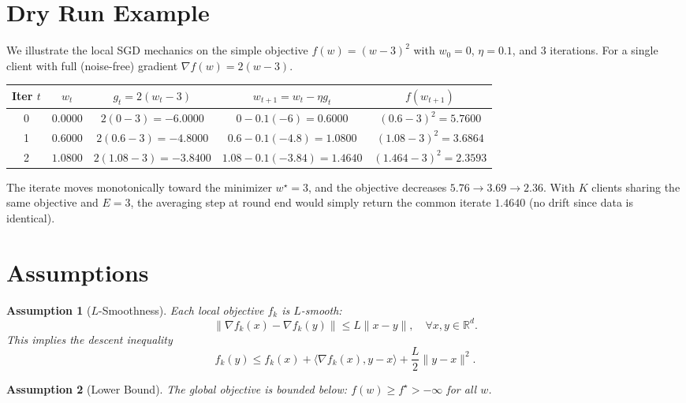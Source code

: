 \documentclass[11pt]{article}
\newtheorem{assumption}{Assumption}
\begin{document}
\section*{Dry Run Example}

We illustrate the local SGD mechanics on the simple objective
$f(w) = (w-3)^2$ with $w_0 = 0$, $\eta = 0.1$, and $3$ iterations.
For a single client with full (noise-free) gradient
$\nabla f(w) = 2(w-3)$.

\begin{center}
\begin{tabular}{c|c|c|c|c}
Iter $t$ & $w_t$ & $g_t = 2(w_t - 3)$ & $w_{t+1} = w_t - \eta g_t$ & $f(w_{t+1})$\\
\hline
0 & $0.0000$ & $2(0-3) = -6.0000$ & $0 - 0.1(-6) = 0.6000$ & $(0.6-3)^2 = 5.7600$\\
1 & $0.6000$ & $2(0.6-3) = -4.8000$ & $0.6 - 0.1(-4.8) = 1.0800$ & $(1.08-3)^2 = 3.6864$\\
2 & $1.0800$ & $2(1.08-3) = -3.8400$ & $1.08 - 0.1(-3.84) = 1.4640$ & $(1.464-3)^2 = 2.3593$\\
\end{tabular}
\end{center}

The iterate moves monotonically toward the minimizer $w^\star = 3$, and the
objective decreases $5.76 \to 3.69 \to 2.36$. With $K$ clients sharing the
same objective and $E=3$, the averaging step at round end would simply return
the common iterate $1.4640$ (no drift since data is identical).

\section*{Assumptions}

\begin{assumption}[$L$-Smoothness]\label{a:smooth}
Each local objective $f_k$ is $L$-smooth:
\[
\|\nabla f_k(x) - \nabla f_k(y)\| \le L\|x - y\|,
\quad \forall x,y \in \mathbb{R}^d.
\]
This implies the descent inequality
\[
f_k(y) \le f_k(x) + \langle \nabla f_k(x), y - x\rangle
        + \frac{L}{2}\|y-x\|^2.
\]
\end{assumption}

\begin{assumption}[Lower Bound]\label{a:lb}
The global objective is bounded below:
$f(w) \ge f^\star > -\infty$ for all $w$.
\end{assumption}
\end{document}
